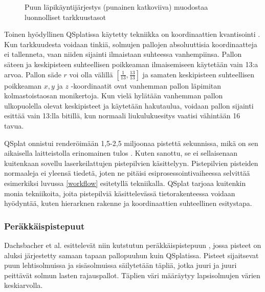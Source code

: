 \begin{figure}
    \centering
    
    \caption{Puun läpikäyntijärjestys (punainen katkoviiva) muodostaa luonnolliset tarkkuustasot}
    \label{tarkkuustasot}
\end{figure}

Toinen hyödyllinen QSplatissa käytetty tekniikka on koordinaattien kvantisointi . Kun tarkkuudesta voidaan tinkiä, solmujen pallojen absoluuttisia koordinaatteja ei tallenneta, vaan niiden sijainti ilmaistaan suhteessa vanhempiinsa. Pallon säteen ja keskipisteen suhteellisen poikkeaman ilmaisemiseen käytetään vain 13:a arvoa. Pallon säde $r$ voi olla välillä $[\frac{1}{13}, \frac{13}{13}]$ ja samaten keskipisteen suhteellisen poikkeaman $x, y$ ja $z$ -koordinaatit ovat vanhemman pallon läpimitan kolmastoistaosan monikertoja. Kun vielä hylätään vanhemman pallon ulkopuolella olevat keskipisteet ja käytetään hakutaulua, voidaan pallon sijainti esittää vain 13:lla bitillä, kun normaali liukulukuesitys vaatisi vähintään 16 tavua. \cite{qsplat}

QSplat onnistui renderöimään 1,5-2,5 miljoonaa pistettä sekunnissa, mikä on sen aikaisella laitteistolla erinomainen tulos \cite{qsplat}. Kuten sanottu, se ei sellaisenaan kuitenkaan sovellu laserkeilattujen pistepilvien käsittelyyn. Pistepilvien pisteiden normaaleja ei yleensä tiedetä, joten ne pitäisi esiprosessointivaiheessa selvittää esimerkiksi luvussa \ref{workflow} esitetyllä tekniikalla. QSplat tarjoaa kuitenkin monia tekniikoita, joita pistepilviä käsittelevässä tietorakenteessa voidaan hyödyntää, kuten hierarknen rakenne ja koordinaattien suhteellinen esitystapa.



\subsubsection{Peräkkäispistepuut}
Dachsbacher et al. esittelevät niin kutstutun peräkkäispistepuun , jossa pisteet on aluksi järjestetty samaan tapaan pallopuuhun kuin QSplatissa. Pisteet sijaitsevat puun lehtisolmuissa ja sisäsolmuissa säilytetään täpliä, jotka juuri ja juuri peittävät solmun lasten rajauspallot. Täplien väri määräytyy lapsisolmujen värien keskiarvolla. \cite{spt}

